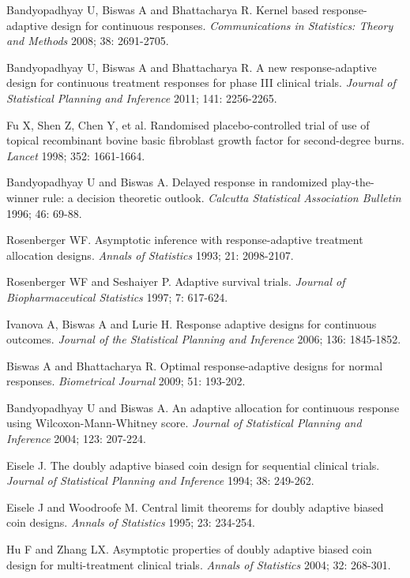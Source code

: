 \begin{thebibliography}
 Bandyopadhyay U, Biswas A  and Bhattacharya R. Kernel based response-adaptive design for continuous responses. \textit{Communications in Statistics: Theory and Methods} 2008; 38: 2691-2705.

 Bandyopadhyay U, Biswas A  and Bhattacharya R. A new response-adaptive design for continuous treatment responses for phase III clinical trials.  \textit{Journal of Statistical Planning and Inference} 2011; 141: 2256-2265.

  Fu X, Shen Z, Chen Y, et al. Randomised placebo-controlled trial of use of topical recombinant bovine basic fibroblast growth factor for second-degree burns. \textit{Lancet} 1998; 352: 1661-1664.

 Bandyopadhyay U and Biswas A. Delayed response in randomized play-the-winner rule: a  decision  theoretic outlook. \textit{Calcutta Statistical Association Bulletin} 1996; 46: 69-88.

 Rosenberger WF.  Asymptotic inference with response-adaptive treatment allocation designs. \textit{Annals of Statistics} 1993; 21: 2098-2107.

 Rosenberger WF and Seshaiyer P. Adaptive survival trials. \textit{Journal of Biopharmaceutical Statistics} 1997; 7: 617-624.

 Ivanova A, Biswas A and Lurie H. Response adaptive designs for continuous outcomes. \textit{Journal of the Statistical Planning and Inference} 2006; 136: 1845-1852.

 Biswas A  and Bhattacharya R. Optimal response-adaptive designs for normal responses. \textit{Biometrical Journal} 2009; 51: 193-202.

 Bandyopadhyay U and Biswas A. An adaptive allocation for continuous response using Wilcoxon-Mann-Whitney score. \textit{Journal of Statistical Planning and Inference} 2004; 123: 207-224.

 Eisele J.  The doubly adaptive biased coin design for sequential clinical trials. \textit{Journal of Statistical Planning and Inference} 1994; 38: 249-262.

 Eisele J and Woodroofe M. Central limit theorems for doubly adaptive biased coin designs. \textit{Annals of Statistics} 1995; 23: 234-254.

 Hu F and Zhang LX. Asymptotic properties of doubly adaptive biased coin design for multi-treatment clinical trials. \textit{Annals of Statistics} 2004; 32: 268-301.


\end{thebibliography}
